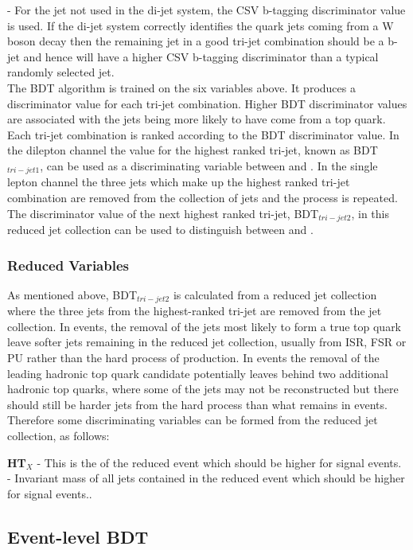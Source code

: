 \textbf{\CSVj} - For the jet not used in the di-jet system, the CSV b-tagging discriminator value is used. If the di-jet system correctly identifies the quark jets coming from a W boson decay then the remaining jet in a good tri-jet combination should be a b-jet and hence will have a higher CSV b-tagging discriminator than a typical randomly selected jet.\\
The BDT algorithm is trained on the six variables above. It produces a discriminator value for each tri-jet combination. Higher BDT discriminator values are associated with the jets being more likely to have come from a top quark. Each tri-jet combination is ranked according to the BDT discriminator value. In the dilepton channel the value for the highest ranked tri-jet, known as BDT$_{tri-jet1}$, can be used as a discriminating variable between \tttt and \ttbar. In the single lepton channel the three jets which make up the highest ranked tri-jet combination are removed from the collection of jets and the process is repeated. The discriminator value of the next highest ranked tri-jet, BDT$_{tri-jet2}$, in this reduced jet collection can be used to distinguish between \tttt and \ttbar.

\subsubsection{Reduced Variables}
As mentioned above, BDT$_{tri-jet2}$ is calculated from a reduced jet collection where the three jets from the highest-ranked tri-jet are removed from the jet collection. In \ttbar events, the removal of the jets most likely to form a true top quark leave softer jets remaining in the reduced jet collection, usually from ISR, FSR or PU rather than the hard process of \ttbar production. In \tttt events the removal of the leading hadronic top quark candidate potentially leaves behind two additional hadronic top quarks, where some of the jets may not be reconstructed but there should still be harder jets from the hard process than what remains in \ttbar events. Therefore some discriminating variables can be formed from the reduced jet collection, as follows:

\textbf{HT$_{X}$} - This is the \HT of the reduced event which should be higher for signal \tttt events.\\
\textbf{\sumjetmassX} - Invariant mass of all jets contained in the reduced event which should be higher for signal \tttt events..

\subsection{Event-level BDT}

